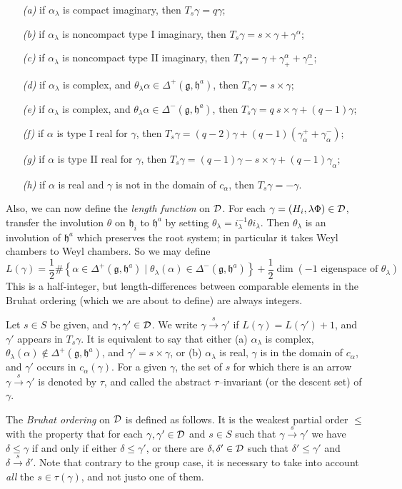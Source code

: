 \documentclass[11 pt]{article}
\def\ra{\rightarrow}
\def\rao#1{\overset{#1}\ra}
\def\1{^{-1}}
\def\a{\alpha}
\def\D{{\cal D}}
\def\d{\delta}
\def\F{\Phi}
\def\g{\gamma}
\def\gf{{\mathfrak g}}
\def\hf{{\mathfrak h}}
\def\l{\lambda}
\def\t{\theta}
\begin{document}
\begin{itemize}
\item[\it(a)]if $\a_\l$ is compact imaginary, then $T_s\g=q\g$;
\item[\it(b)]if $\a_\l$ is noncompact type I imaginary, then 
$T_s\g=s\times\g+\g^\a$;
\item[\it(c)]if $\a_\l$ is noncompact type II imaginary, then
$T_s\g=\g+\g^\a_++\g^\a_-$;
\item[\it(d)]if $\a_\l$ is complex, and $\t_\l\a\in\Delta^+(\gf,\hf^a)$,
then $T_s\g=s\times\g$;
\item[\it(e)]if $\a_\l$ is complex, and $\t_\l\a\in\Delta^-(\gf,\hf^a)$,
then $T_s\g=q\>s\times\g+(q-1)\g$;
\item[\it(f)]if $\a$ is type I real for $\g$, then
$T_s\g=(q-2)\g+(q-1)(\g_\a^++\g_\a^-)$;
\item[\it(g)]if $\a$ is type II real for $\g$, then
$T_s\g=(q-1)\g-s\times\g+(q-1)\g_\a$;
\item[\it(h)]if $\a$ is real and $\g$ is not in the domain of $c_\a$,
then $T_s\g=-\g$.
\end{itemize}

\medskip

Also, we can now define the \textit{length function} on $\D$. For each
$\g=(H_i,\l\F)\in\D$, transfer the involution $\t$ on $\hf_i$ to $\hf^a$
by setting $\t_\l=i_\l\1\t i_\l$. Then $\t_\l$ is an involution of $\hf^a$
which preserves the root system; in particular it takes Weyl chambers to
Weyl chambers. So we may define
$$
L(\g)=\frac{1}{2}\#\left\{\a\in\Delta^+(\gf,\hf^a)\mid\t_\l(\a)\in
\Delta^-(\gf,\hf^a)\right\}+\frac{1}{2}\dim(\textrm{$-1$ eigenspace of 
$\t_\l$})
$$
This is a half-integer, but length-differences between comparable elements
in the Bruhat ordering (which we are about to define) are always integers.

\medskip

Let $s\in S$ be given, and $\g,\g'\in\D$. We write $\g\rao s\g'$ if 
$L(\g)=L(\g')+1$, and $\g'$ appears in $T_s\g$. It is equivalent to say
that either (a) $\a_\l$ is complex, $\t_\l(\a)\not\in\Delta^+(\gf,\hf^a)$, 
and $\g'=s\times\g$, or (b) $\a_\l$ is real, $\g$ is in the domain of $c_\a$,
and $\g'$ occurs in $c_\a(\g)$. For a given $\g$, the set of $s$ for which
there is an arrow $\g\rao s\g'$ is denoted by $\tau$, and called the
abstract $\tau$--invariant (or the descent set) of $\g$.

The {\em Bruhat ordering} on $\D$ is defined as follows. It is the weakest
partial order $\leq$ with the property that for each $\g,\g'\in\D$ and $s\in S$
such that $\g\rao s\g'$ we have $\d\leq\g$ if and only if either $\d\leq\g'$,
or there are $\d,\d'\in\D$ such that $\d'\leq\g'$ and $\d\rao s\d'$. Note that
contrary to the group case, it is necessary to take into account {\em all} the
$s\in\tau(\g)$, and not justo one of them.
\end{document}
